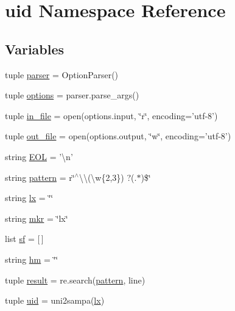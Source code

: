 \hypertarget{namespaceuid}{\section{uid Namespace Reference}
\label{namespaceuid}
}
\subsection*{Variables}
\begin{DoxyCompactItemize}
\item 
tuple \hyperlink{namespaceuid_a4039208c718ac9ab3d1a34f9c46376e5}{parser} = Option\+Parser()
\item 
tuple \hyperlink{namespaceuid_a72496a499a950e7763f54daad4112644}{options} = parser.\+parse\+\_\+args()
\item 
tuple \hyperlink{namespaceuid_ad8ae4f6e71a89183bdd76ea3bb1d4b77}{in\+\_\+file} = open(options.\+input, \char`\"{}r\char`\"{}, encoding='utf-\/8')
\item 
tuple \hyperlink{namespaceuid_abafbdda8c90e0befa2cee03e11a2ee22}{out\+\_\+file} = open(options.\+output, \char`\"{}w\char`\"{}, encoding='utf-\/8')
\item 
string \hyperlink{namespaceuid_af23356e75a458bc84f8a06c4c25666d7}{E\+O\+L} = '\textbackslash{}n'
\item 
string \hyperlink{namespaceuid_a37cd778413aaba0d0e0610ffc35646a2}{pattern} = r\char`\"{}$^\wedge$\textbackslash{}\textbackslash{}(\textbackslash{}w\{2,3\}) ?(.$\ast$)\$\char`\"{}
\item 
string \hyperlink{namespaceuid_aa8bd0ffc225dc8124099330d1014bf66}{lx} = \char`\"{}\char`\"{}
\item 
string \hyperlink{namespaceuid_a542decb494fb3ac0da8886ab033622ad}{mkr} = \char`\"{}lx\char`\"{}
\item 
list \hyperlink{namespaceuid_ae6f932fe5ea3081fc75207a773dc3c0f}{sf} = \mbox{[}$\,$\mbox{]}
\item 
string \hyperlink{namespaceuid_ade7b1be6934c8984615916e73a81d131}{hm} = \char`\"{}\char`\"{}
\item 
tuple \hyperlink{namespaceuid_a1baa2d4ae8ea6e7427b911466184d548}{result} = re.\+search(\hyperlink{namespaceuid_a37cd778413aaba0d0e0610ffc35646a2}{pattern}, line)
\item 
tuple \hyperlink{namespaceuid_a41f0a6fb6938bc67f4ab035ac008504c}{uid} = uni2sampa(\hyperlink{namespaceuid_aa8bd0ffc225dc8124099330d1014bf66}{lx})
\end{DoxyCompactItemize}


